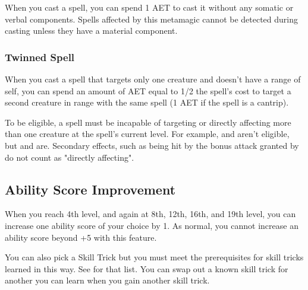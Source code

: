 When you cast a spell, you can spend 1 AET to cast it without any somatic or verbal components. Spells affected by this metamagic cannot be detected during casting unless they have a material component.

\subsubsection{Twinned Spell}

When you cast a spell that targets only one creature and doesn't have a range of self, you can spend an amount of AET equal to 1/2 the spell's cost to target a second creature in range with the same spell (1 AET if the spell is a cantrip).

To be eligible, a spell must be incapable of targeting or directly affecting more than one creature at the spell's current level. For example,  and  aren't eligible, but  and  are. Secondary effects, such as being hit by the bonus attack granted by  do not count as "directly affecting".

\subsection{Ability Score Improvement}

When you reach 4th level, and again at 8th, 12th, 16th, and 19th level, you can increase one ability score of your choice by 1. As normal, you cannot increase an ability score beyond +5 with this feature.

You can also pick a Skill Trick but you must meet the prerequisites for skill tricks learned in this way. See  for that list. You can swap out a known skill trick for another you can learn when you gain another skill trick.

